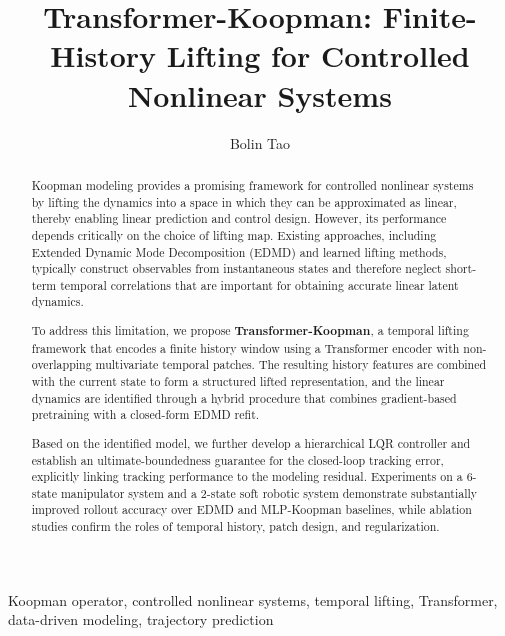 \documentclass[journal]{IEEEtran}
\begin{document}
\title{Transformer-Koopman: Finite-History Lifting for Controlled Nonlinear Systems}

\author{Bolin Tao}


\maketitle

\begin{abstract}
Koopman modeling provides a promising framework for controlled nonlinear systems by lifting the dynamics into a space in which they can be approximated as linear, thereby enabling linear prediction and control design. However, its performance depends critically on the choice of lifting map. Existing approaches, including Extended Dynamic Mode Decomposition (EDMD) and learned lifting methods, typically construct observables from instantaneous states and therefore neglect short-term temporal correlations that are important for obtaining accurate linear latent dynamics.

To address this limitation, we propose \textbf{Transformer-Koopman}, a temporal lifting framework that encodes a finite history window using a Transformer encoder with non-overlapping multivariate temporal patches. The resulting history features are combined with the current state to form a structured lifted representation, and the linear dynamics are identified through a hybrid procedure that combines gradient-based pretraining with a closed-form EDMD refit.

Based on the identified model, we further develop a hierarchical LQR controller and establish an ultimate-boundedness guarantee for the closed-loop tracking error, explicitly linking tracking performance to the modeling residual. Experiments on a 6-state manipulator system and a 2-state soft robotic system demonstrate substantially improved rollout accuracy over EDMD and MLP-Koopman baselines, while ablation studies confirm the roles of temporal history, patch design, and regularization.
\end{abstract}

\begin{IEEEkeywords}
Koopman operator, controlled nonlinear systems, temporal lifting, Transformer, data-driven modeling, trajectory prediction
\end{IEEEkeywords}

\end{document}

